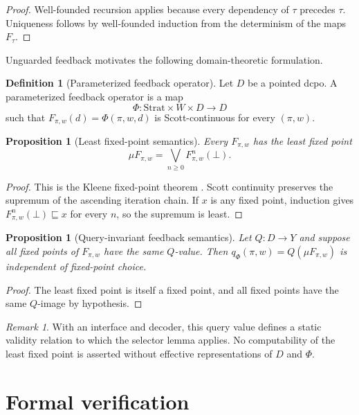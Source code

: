 \documentclass[11pt]{article}
\theoremstyle{plain}
\newtheorem{proposition}[theorem]{Proposition}
\theoremstyle{definition}
\newtheorem{definition}[theorem]{Definition}
\theoremstyle{remark}
\newtheorem{remark}[theorem]{Remark}
\begin{document}
\begin{proof}
Well-founded recursion applies because every dependency of $\tau$ precedes
$\tau$. Uniqueness follows by well-founded induction from the determinism of the
maps $F_\tau$.
\end{proof}

Unguarded feedback motivates the following domain-theoretic formulation.

\begin{definition}[Parameterized feedback operator]\label{def:feedback}
Let $D$ be a pointed dcpo. A parameterized feedback operator is a map
\[
\Phi:\mathrm{Strat}\times W\times D\to D
\]
such that $F_{\pi,w}(d)=\Phi(\pi,w,d)$ is Scott-continuous for every
$(\pi,w)$.
\end{definition}

\begin{proposition}[Least fixed-point semantics]\label{prop:leastfp}
Every $F_{\pi,w}$ has the least fixed point
\[
\mu F_{\pi,w}=\bigvee_{n\ge0}F_{\pi,w}^{n}(\bot).
\]
\end{proposition}

\begin{proof}
This is the Kleene fixed-point theorem \cite{abramskyjung}. Scott continuity
preserves the supremum of the ascending iteration chain. If $x$ is any fixed
point, induction gives $F_{\pi,w}^n(\bot)\sqsubseteq x$ for every $n$, so the
supremum is least.
\end{proof}

\begin{proposition}[Query-invariant feedback semantics]
\label{prop:query-invariant}
Let $Q:D\to Y$ and suppose all fixed points of $F_{\pi,w}$ have the same
$Q$-value. Then $q_\Phi(\pi,w)=Q(\mu F_{\pi,w})$ is independent of fixed-point
choice.
\end{proposition}

\begin{proof}
The least fixed point is itself a fixed point, and all fixed points have the same
$Q$-image by hypothesis.
\end{proof}

\begin{remark}
With an interface and decoder, this query value defines a static validity
relation to which the selector lemma applies. No computability of the least
fixed point is asserted without effective representations of $D$ and $\Phi$.
\end{remark}


\section*{Formal verification}
\end{document}
